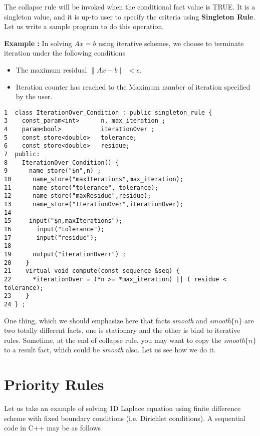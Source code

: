 \par The collapse rule will be invoked when the conditional fact value is TRUE. It is
a singleton value, and it is up-to user to specify the criteria using {\bf Singleton Rule}.
Let us write a sample program to do this operation.
%
\par {\bf Example :} In solving $Ax=b$ using iterative schemes, we choose to terminate
iteration under the following conditions
\begin{itemize}
\item  The maximum residual $\parallel Ax-b \parallel$ $< \epsilon$.
\item  Iteration counter has reached to the Maximum number of iteration specified by the
       user.
\end{itemize}
\begin{verbatim}
1  class IterationOver_Condition : public singleton_rule {
3    const_param<int>      n, max_iteration ;
4    param<bool>           iterationOver ;
5    const_store<double>   tolerance;
6    const_store<double>   residue;
7  public:
8    IterationOver_Condition() {
9      name_store("$n",n) ;
10      name_store("maxIterations",max_iteration);
11      name_store("tolerance", tolerance);
12      name_store("maxResidue",residue);
13      name_store("IterationOver",iterationOver);
14
15     input("$n,maxIterations");
16       input("tolerance");
17       input("residue");
18
19      output("iterationOverr") ;
20    }
21    virtual void compute(const sequence &seq) {
22      *iterationOver = (*n >= *max_iteration) || ( residue < tolerance);
23    }
24 } ;
\end{verbatim}

\par One thing, which we should emphasize here that facts {\em smooth} and {\em smooth$\{n\}$}
are two totally different facts, one is stationary and the other is bind to iterative
rules. Sometime, at the end of collapse rule, you may want to copy the {\em smooth$\{n\}$} to
a result fact, which could be {\em smooth} also. Let us see how we do it.

\section { Priority Rules }
\par Let us take an example of solving 1D Laplace equation using finite difference
scheme with fixed boundary conditions (i.e. Dirichlet conditions). 
A sequential code in C++ may be as follows

